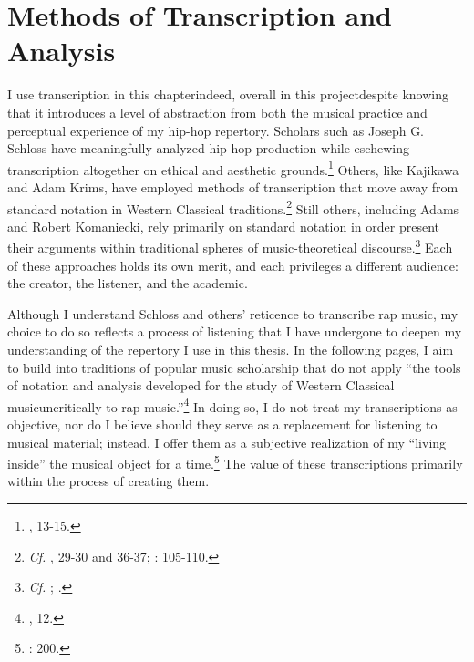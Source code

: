 \doublespacing
\section{Methods of Transcription and Analysis}
I use transcription in this chapter\textemdash indeed, overall in this project\textemdash despite knowing that it introduces a level of abstraction from both the musical practice and perceptual experience of my hip-hop repertory. Scholars such as Joseph G. Schloss have meaningfully analyzed hip-hop production while eschewing transcription altogether on ethical and aesthetic grounds.\footnote{\cite{josephgschlossMakingBeatsArt2004}, 13-15.} Others, like Kajikawa and Adam Krims, have employed methods of transcription that move away from standard notation in Western Classical traditions.\footnote{\textit{Cf.} \cite{lorenkajikawaSoundingRaceRap2015}, 29-30 and 36-37; \cite{adamkrimsRapMusicPoetics2000}: 105-110.} Still others, including Adams and Robert Komaniecki, rely primarily on standard notation in order present their arguments within traditional spheres of music-theoretical discourse.\footnote{\textit{Cf. }\cite{kyleadamsMetricalTechniquesFlow2009}; \cite{robertkomanieckiAnalyzingCollaborativeFlow2017}.} Each of these approaches holds its own merit, and each privileges a different audience: the creator, the listener, and the academic.

Although I understand Schloss and others' reticence to transcribe rap music, my choice to do so reflects a process of listening that I have undergone to deepen my understanding of the repertory I use in this thesis. In the following pages, I aim to build into traditions of popular music scholarship that do not apply ``the tools of notation and analysis developed for the study of Western Classical music\textellipsis uncritically to rap music.''\footnote{\cite{lorenkajikawaSoundingRaceRap2015}, 12.}  In doing so, I do not treat my transcriptions as objective, nor do I believe should they serve as a replacement for listening to musical material; instead, I offer them as a subjective realization of my ``living inside'' the musical object for a time.\footnote{\cite{peterwinklerWritingGhostNotes1997}: 200.} The value of these transcriptions primarily within the process of creating them.

